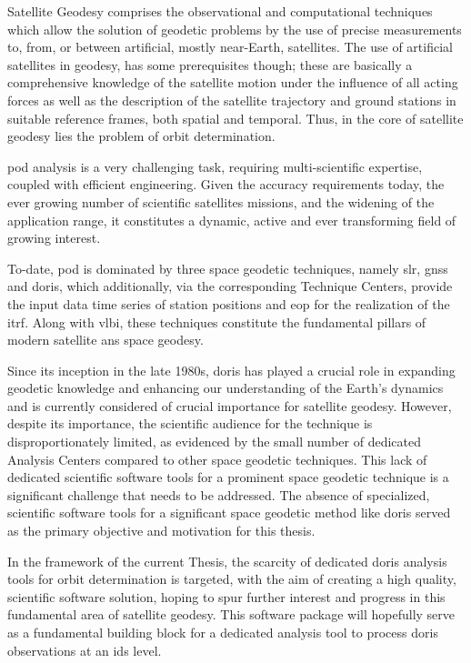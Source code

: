 Satellite Geodesy comprises the observational and computational techniques which
allow the solution of geodetic problems by the use of precise measurements to,
from, or between artificial, mostly near-Earth, satellites. The use of artificial 
satellites in geodesy, has some prerequisites though; these are basically a 
comprehensive knowledge of the satellite motion under the influence of all 
acting forces as well as the description of the satellite trajectory and
ground stations in suitable reference frames, both spatial and temporal. Thus, in
the core of satellite geodesy lies the problem of orbit determination.

\gls{pod} analysis is a very challenging task, requiring multi-scientific expertise,
coupled with efficient engineering. Given the accuracy requirements today,
the ever growing number of scientific satellites missions, and the widening of the
application range, it constitutes a dynamic, active and ever transforming field of 
growing interest.

To-date, \gls{pod} is dominated by three space geodetic techniques, namely 
\gls{slr}, \gls{gnss} and \gls{doris}, which additionally, via the corresponding 
Technique Centers, provide the input data time series of station positions and 
\gls{eop} for the realization of the \gls{itrf}. Along with \gls{vlbi}, these 
techniques constitute the fundamental pillars of modern satellite ans space geodesy.

Since its inception in the late 1980s, \gls{doris} has played a crucial role in 
expanding geodetic knowledge and enhancing our understanding of the Earth's 
dynamics and is currently considered of crucial importance for satellite geodesy. 
However, despite its importance, the scientific audience for the technique is 
disproportionately limited, as evidenced by the small number of dedicated Analysis 
Centers compared to other space geodetic techniques. This
lack of dedicated scientific software tools for a prominent space geodetic technique
is a significant challenge that needs to be addressed. The absence of specialized,
scientific software tools for a significant space geodetic method like \gls{doris} 
served as the primary objective and motivation for this thesis.

In the framework of the current Thesis, the scarcity of dedicated \gls{doris} 
analysis tools for orbit determination is targeted, with the aim of creating a 
high quality, scientific software solution, hoping to spur further interest and 
progress in this fundamental area of satellite geodesy. This software package
will hopefully serve as a fundamental building block for a dedicated analysis 
tool to process \gls{doris} observations at an \gls{ids} level.
